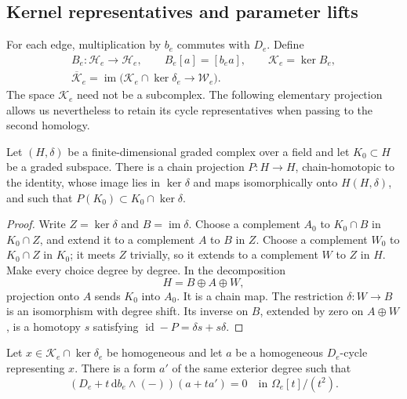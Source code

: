 \subsection{Kernel representatives and parameter lifts}

For each edge, multiplication by \(b_e\) commutes with \(D_e\).  Define
\begin{equation}\label{ten:kernels}
 \begin{gathered}
 B_e:\mathcal H_e\to\mathcal H_e,\qquad B_e[a]=[b_ea],
 \qquad \mathcal K_e=\ker B_e,\\
 \overline{\mathcal K}_e=
 \operatorname{im}\bigl(\mathcal K_e\cap\ker\delta_e
                                      \longrightarrow\mathcal W_e\bigr).
 \end{gathered}
\end{equation}
The space \(\mathcal K_e\) need not be a subcomplex.  The following
elementary projection allows us nevertheless to retain its cycle
representatives when passing to the second homology.

\begin{lemma}\label{ten:projection}
Let \((H,\delta)\) be a finite-dimensional graded complex over a field and
let \(K_0\subset H\) be a graded subspace.  There is a chain projection
\(P:H\to H\), chain-homotopic to the identity, whose image lies in
\(\ker\delta\) and maps isomorphically onto \(H(H,\delta)\), and such that
\(P(K_0)\subset K_0\cap\ker\delta\).
\end{lemma}

\begin{proof}
Write \(Z=\ker\delta\) and \(B=\operatorname{im}\delta\).
Choose a complement \(A_0\) to \(K_0\cap B\) in \(K_0\cap Z\), and
extend it to a complement \(A\) to \(B\) in \(Z\).
Choose a complement \(W_0\) to \(K_0\cap Z\) in \(K_0\); it meets
\(Z\) trivially, so it extends to a complement \(W\) to \(Z\) in \(H\).
Make every choice degree by degree.  In the decomposition
\[
 H=B\oplus A\oplus W,
\]
projection onto \(A\) sends \(K_0\) into \(A_0\).  It is a chain map.
The restriction \(\delta:W\to B\) is an isomorphism with degree shift.
Its inverse on \(B\), extended by zero on \(A\oplus W\), is a homotopy
\(s\) satisfying \(\operatorname{id}-P=\delta s+s\delta\).
\end{proof}

\begin{lemma}\label{ten:lift}
Let \(x\in\mathcal K_e\cap\ker\delta_e\) be homogeneous and let \(a\)
be a homogeneous \(D_e\)-cycle representing \(x\).  There is a form
\(a'\) of the same exterior degree such that
\begin{equation}\label{ten:lift-equation}
 (D_e+t\,\mathrm db_e\wedge(-))(a+ta')=0
                       \quad\text{in }\Omega_e[t]/(t^2).
\end{equation}
\end{lemma}

